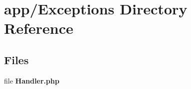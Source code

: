 \section{app/\+Exceptions Directory Reference}
\label{dir_1e006b1fe9114cba7f26c7cf7069b5a2}
\subsection*{Files}
\begin{DoxyCompactItemize}
\item 
file {\bf Handler.\+php}
\end{DoxyCompactItemize}

